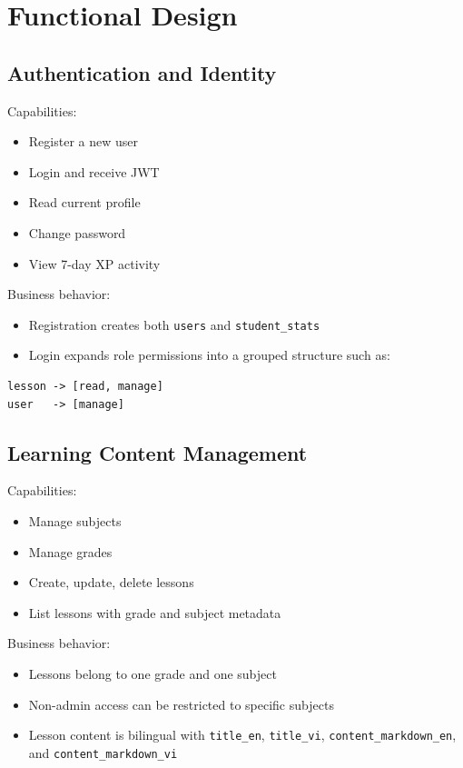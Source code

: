 \documentclass[11pt,a4paper]{article}
\newcommand{\docpath}[1]{\texttt{#1}}
\begin{document}
\section{Functional Design}

\subsection{Authentication and Identity}

Capabilities:
\begin{itemize}[leftmargin=1.5em]
  \item Register a new user
  \item Login and receive JWT
  \item Read current profile
  \item Change password
  \item View 7-day XP activity
\end{itemize}

Business behavior:
\begin{itemize}[leftmargin=1.5em]
  \item Registration creates both \docpath{users} and \docpath{student\_stats}
  \item Login expands role permissions into a grouped structure such as:
\end{itemize}

\begin{lstlisting}[style=doccode]
lesson -> [read, manage]
user   -> [manage]
\end{lstlisting}

\subsection{Learning Content Management}

Capabilities:
\begin{itemize}[leftmargin=1.5em]
  \item Manage subjects
  \item Manage grades
  \item Create, update, delete lessons
  \item List lessons with grade and subject metadata
\end{itemize}

Business behavior:
\begin{itemize}[leftmargin=1.5em]
  \item Lessons belong to one grade and one subject
  \item Non-admin access can be restricted to specific subjects
  \item Lesson content is bilingual with \docpath{title\_en}, \docpath{title\_vi}, \docpath{content\_markdown\_en}, and \docpath{content\_markdown\_vi}
\end{itemize}
\end{document}
